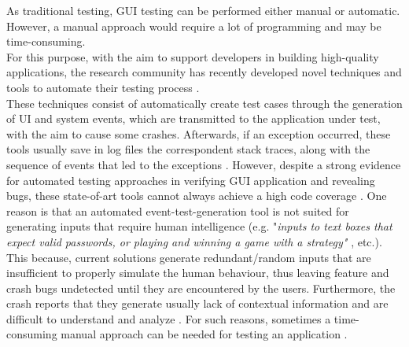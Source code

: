 As traditional testing, GUI testing can be performed either manual or automatic. However, a manual approach would require a lot of programming and may be time-consuming. \\  
For this purpose, with the aim to support developers in building high-quality applications, the research community has recently developed novel techniques and tools to automate their testing process \cite{sapienz, dynodroid ,muccini,Hu:2011:AGT:1982595.1982612}. \\
These techniques consist of automatically create test cases through the generation of UI and system events, which are transmitted to the application under test, with the aim to cause some crashes. Afterwards, if an exception occurred, these tools usually save in log files the correspondent stack traces, along with the sequence of events that led to the exceptions \cite{muccini}. 
However, despite a strong evidence for automated testing approaches in verifying GUI application and revealing bugs, these state-of-art tools cannot always achieve a high code coverage \cite{Nagappan2015}. 
One reason is that an automated event-test-generation tool is not suited for generating inputs that require human intelligence (e.g. "\textit{inputs to text boxes that expect valid passwords, or playing and winning a game with a strategy"} \cite{dynodroid}, etc.). This because, current solutions generate redundant/random inputs that are insufficient to properly simulate the human behaviour, thus leaving feature and crash bugs undetected until they are encountered by the users. Furthermore, the crash reports that they generate usually lack of contextual information and are difficult to understand and analyze \cite{Chen, Joorabchi}. 
For such reasons, sometimes a time-consuming manual approach can be needed for testing an application \cite{Nagappan2015}. \\


